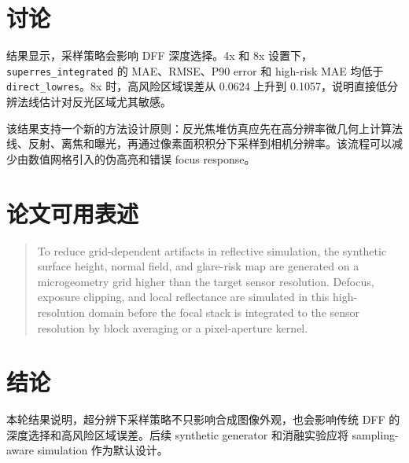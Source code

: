 \documentclass[11pt,a4paper]{ctexart}
\begin{document}
\section{讨论}

结果显示，采样策略会影响 DFF 深度选择。4x 和 8x 设置下，\texttt{superres\_integrated} 的 MAE、RMSE、P90 error 和 high-risk MAE 均低于 \texttt{direct\_lowres}。8x 时，高风险区域误差从 0.0624 上升到 0.1057，说明直接低分辨法线估计对反光区域尤其敏感。

该结果支持一个新的方法设计原则：反光焦堆仿真应先在高分辨率微几何上计算法线、反射、离焦和曝光，再通过像素面积积分下采样到相机分辨率。该流程可以减少由数值网格引入的伪高亮和错误 focus response。

\section{论文可用表述}

\begin{quote}
To reduce grid-dependent artifacts in reflective simulation, the synthetic surface height, normal field, and glare-risk map are generated on a microgeometry grid higher than the target sensor resolution. Defocus, exposure clipping, and local reflectance are simulated in this high-resolution domain before the focal stack is integrated to the sensor resolution by block averaging or a pixel-aperture kernel.
\end{quote}

\section{结论}

本轮结果说明，超分辨下采样策略不只影响合成图像外观，也会影响传统 DFF 的深度选择和高风险区域误差。后续 synthetic generator 和消融实验应将 sampling-aware simulation 作为默认设计。
\end{document}
